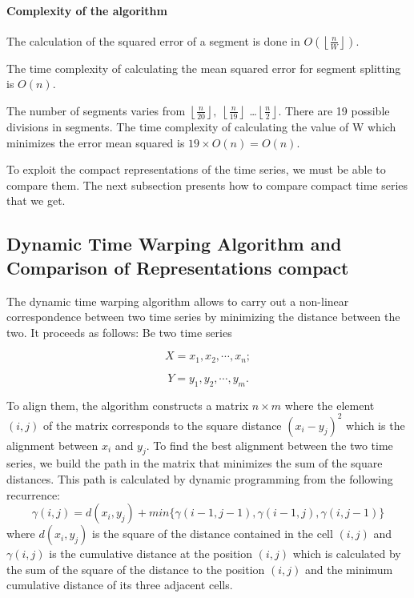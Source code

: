  

\paragraph{Complexity of the algorithm}
The calculation of the squared error of a segment is done in $ O(\left \lfloor
\frac{n}{W} \right \rfloor) $.

The time complexity of calculating the mean squared error for segment splitting is
$ O(n). $


The number of segments varies from $ \left \lfloor \frac{n}{20} \right \rfloor, \; \left \lfloor \frac{n}{19} \right \rfloor $ \ldots $ \left \lfloor \frac{n}{2} \right \rfloor $. There are 19 possible divisions in segments. The time complexity of calculating the value of W which minimizes the error
mean squared is $ 19 \times O(n) = O(n) $.


To exploit the compact representations of the time series, we must be able to compare them. The next subsection presents how to compare compact time series that we get.

\subsection{Dynamic Time Warping Algorithm and Comparison of Representations compact}

The dynamic time warping algorithm \cite{Keogh2004} allows to carry out a non-linear correspondence between two time series by minimizing the distance between the two. It proceeds as follows:
Be two time series

\[
X=x_{1},x_{2},\cdots,x_{n};
\]


\[
Y=y_{1},y_{2},\cdots,y_{m}.
\]

 To align them, the algorithm constructs a matrix $ n \times m $ where
the element $ (i, j) $ of the matrix corresponds to the square distance $ (x_{i} - y_{j}) ^ {2} $ which
is the alignment between $ x_{i} $ and $ y_{j} $. To find the best alignment between the two time series, we build
the path in the matrix that minimizes the sum of the square distances. This path is calculated by
dynamic programming from the following recurrence:
\[
\gamma(i, j) = d (x_{i}, y_{j}) + min \{\gamma(i-1, j-1), \gamma(i-1, j), \gamma(i , j-1) \}
\]
where $ d(x_{i}, y_{j}) $ is the square of the distance contained in the cell $ (i, j) $ and $ \gamma(i, j) $ is the
cumulative distance at the position $ (i, j) $ which is calculated by the sum of the square of the distance to
the position $ (i, j) $ and the minimum cumulative distance of its three adjacent cells.


